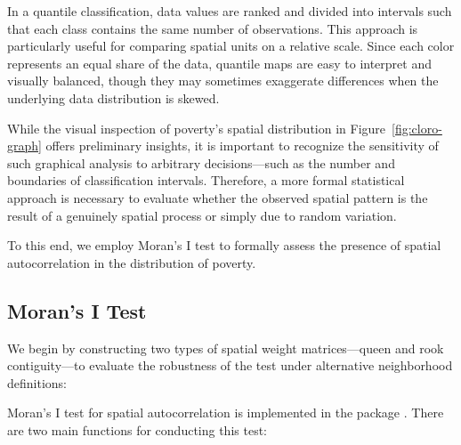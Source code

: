 In a quantile classification, data values are ranked and divided into intervals such that each class contains the same number of observations. This approach is particularly useful for comparing spatial units on a relative scale. Since each color represents an equal share of the data, quantile maps are easy to interpret and visually balanced, though they may sometimes exaggerate differences when the underlying data distribution is skewed.

While the visual inspection of poverty's spatial distribution in Figure~\ref{fig:cloro-graph} offers preliminary insights, it is important to recognize the sensitivity of such graphical analysis to arbitrary decisions---such as the number and boundaries of classification intervals. Therefore, a more formal statistical approach is necessary to evaluate whether the observed spatial pattern is the result of a genuinely spatial process or simply due to random variation.

To this end, we employ Moran's I test to formally assess the presence of spatial autocorrelation in the distribution of poverty.


\subsection{Moran's I Test}

We begin by constructing two types of spatial weight matrices—queen and rook contiguity—to evaluate the robustness of the test under alternative neighborhood definitions:

\begin{knitrout}
\color{fgcolor}\begin{kframe}
\begin{alltt}
 \hlkwb{<-} \hldef{(} \hldef{),}  \hlopt{$}  \hldef{=}  \hldef{)}
  \hlkwb{<-} \hldef{(} \hldef{),}  \hlopt{$}  \hldef{=}  \hldef{)}
\end{alltt}
\end{kframe}
\end{knitrout}

Moran’s I test for spatial autocorrelation is implemented in the  package \citep{spdep}. There are two main functions for conducting this test:

